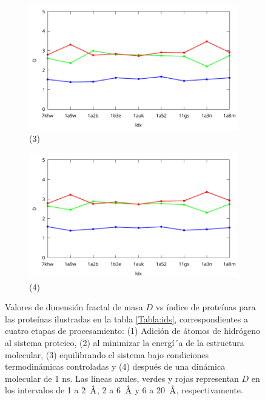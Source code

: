 \begin{figure}[H]
		\begin{subfigure}{0.49\textwidth}
			\centering
			\includegraphics[width=\linewidth,page=1]{graphs/PDBs/Dvsldx/DvsEq.pdf}
			\caption{(3)}
		\end{subfigure}
		\hfill
		\begin{subfigure}{0.49\textwidth}
			\centering
			\includegraphics[width=\linewidth,page=1]{graphs/PDBs/Dvsldx/DvsDm.pdf}
			\caption{(4)}
		\end{subfigure}
		
		\caption{Valores de dimensi\'{o}n fractal de masa $D$ vs \'{i}ndice de prote\'{i}nas para las prote\'{i}nas ilustradas en la tabla \ref{Tabla:ids}, correspondientes a cuatro etapas de procesamiento: (1) Adici\'{o}n de \'{a}tomos de hidr\'{o}geno al sistema proteico, (2) al minimizar la energ\'{i´}a de la estructura molecular, (3) equilibrando el sistema bajo condiciones termodin\'{a}micas controladas y (4) despu\'{e}s de una din\'{a}mica molecular de 1 ns. Las líneas azules, verdes y rojas representan $D$ en los intervalos de 1 a 2~$\textup{\r{A}}$, 2 a 6~$\textup{\r{A}}$ y 6 a 20~$\textup{\r{A}}$, respectivamente.}
		\label{fig:Df-general}
	\end{figure}
	
